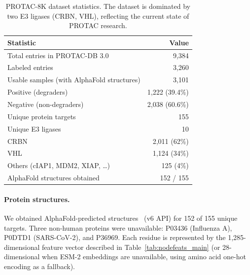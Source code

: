 \documentclass[sigconf]{acmart}
\begin{document}
\begin{table}[!ht]
\centering
\caption{PROTAC-8K dataset statistics. The dataset is dominated by two E3 ligases (CRBN, VHL), reflecting the current state of PROTAC research.}
\label{tab:dataset}
\small
\begin{tabular}{@{}lr@{}}
\toprule
\textbf{Statistic} & \textbf{Value} \\
\midrule
Total entries in PROTAC-DB 3.0 & 9,384 \\
Labeled entries & 3,260 \\
Usable samples (with AlphaFold structures) & 3,101 \\
\quad Positive (degraders) & 1,222 (39.4\%) \\
\quad Negative (non-degraders) & 2,038 (60.6\%) \\[2pt]
Unique protein targets & 155 \\
Unique E3 ligases & 10 \\
\quad CRBN & 2,011 (62\%) \\
\quad VHL & 1,124 (34\%) \\
\quad Others (cIAP1, MDM2, XIAP, \ldots) & 125 (4\%) \\[2pt]
AlphaFold structures obtained & 152 / 155 \\
\bottomrule
\end{tabular}
\end{table}

\paragraph{Protein structures.}
We obtained AlphaFold-predicted structures~\cite{jumper2021alphafold} (v6 API) for 152 of 155 unique targets.
Three non-human proteins were unavailable: P03436 (Influenza A), P0DTD1 (SARS-CoV-2), and P36969.
Each residue is represented by the 1,285-dimensional feature vector described in Table~\ref{tab:nodefeats_main} (or 28-dimensional when ESM-2 embeddings are unavailable, using amino acid one-hot encoding as a fallback).
\end{document}
